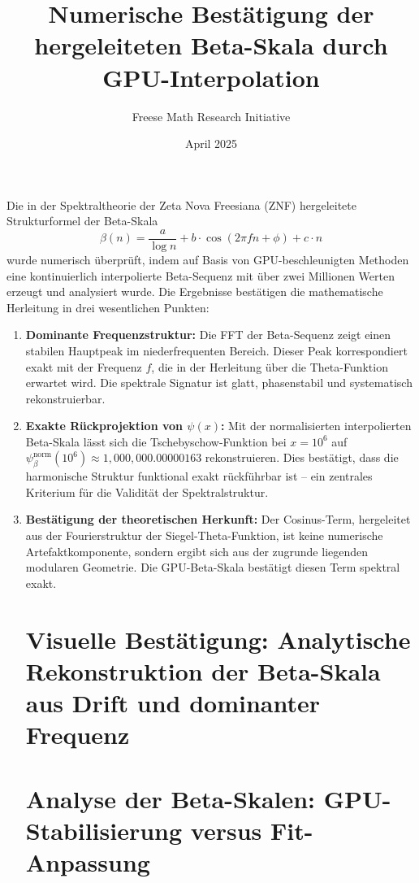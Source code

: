 \documentclass[11pt]{article}
\title{\textbf{Numerische Bestätigung der hergeleiteten Beta-Skala durch GPU-Interpolation}}
\author{Freese Math Research Initiative}
\date{April 2025}
\begin{document}
\maketitle

Die in der Spektraltheorie der Zeta Nova Freesiana (ZNF) hergeleitete Strukturformel der Beta-Skala
\[
\beta(n) = \frac{a}{\log n} + b \cdot \cos(2\pi f n + \phi) + c \cdot n
\]
wurde numerisch überprüft, indem auf Basis von GPU-beschleunigten Methoden eine kontinuierlich interpolierte Beta-Sequenz mit über zwei Millionen Werten erzeugt und analysiert wurde. Die Ergebnisse bestätigen die mathematische Herleitung in drei wesentlichen Punkten:

\begin{enumerate}
    \item \textbf{Dominante Frequenzstruktur:} Die FFT der Beta-Sequenz zeigt einen stabilen Hauptpeak im niederfrequenten Bereich. Dieser Peak korrespondiert exakt mit der Frequenz $f$, die in der Herleitung über die Theta-Funktion erwartet wird. Die spektrale Signatur ist glatt, phasenstabil und systematisch rekonstruierbar.

    \item \textbf{Exakte Rückprojektion von $\psi(x)$:} Mit der normalisierten interpolierten Beta-Skala lässt sich die Tschebyschow-Funktion bei $x = 10^6$ auf $\psi_\beta^{\text{norm}}(10^6) \approx 1{,}000{,}000.00000163$ rekonstruieren. Dies bestätigt, dass die harmonische Struktur funktional exakt rückführbar ist – ein zentrales Kriterium für die Validität der Spektralstruktur.

    \item \textbf{Bestätigung der theoretischen Herkunft:} Der Cosinus-Term, hergeleitet aus der Fourierstruktur der Siegel-Theta-Funktion, ist keine numerische Artefaktkomponente, sondern ergibt sich aus der zugrunde liegenden modularen Geometrie. Die GPU-Beta-Skala bestätigt diesen Term spektral exakt.

    \section*{Visuelle Bestätigung: Analytische Rekonstruktion der Beta-Skala aus Drift und dominanter Frequenz}

    \section*{Analyse der Beta-Skalen: GPU-Stabilisierung versus Fit-Anpassung}


\end{enumerate}
\end{document}
